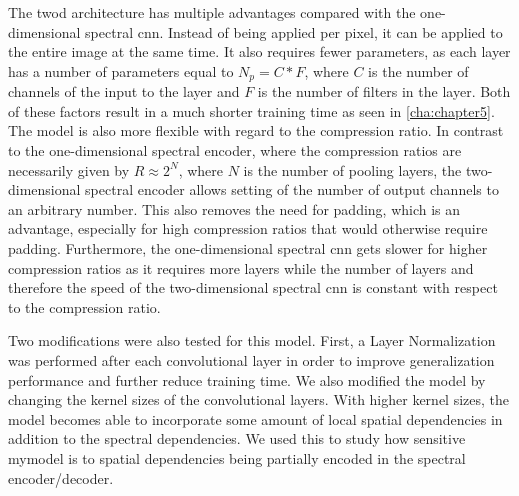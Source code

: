 The \ac{twod} architecture has multiple advantages compared with the one-dimensional spectral \ac{cnn}. Instead of being applied per pixel, it can be applied to the entire image at the same time. It also requires fewer parameters, as each layer has a number of parameters equal to $N_p = C * F$, where $C$ is the number of channels of the input to the layer and $F$ is the number of filters in the layer. Both of these factors result in a much shorter training time as seen in \autoref{cha:chapter5}. The model is also more flexible with regard to the compression ratio. In contrast to the one-dimensional spectral encoder, where the compression ratios are necessarily given by $R \approx 2^N$, where $N$ is the number of pooling layers, the two-dimensional spectral encoder allows setting of the number of output channels to an arbitrary number. This also removes the need for padding, which is an advantage, especially for high compression ratios that would otherwise require padding. Furthermore, the one-dimensional spectral \ac{cnn} gets slower for higher compression ratios as it requires more layers while the number of layers and therefore the speed of the two-dimensional spectral \ac{cnn} is constant with respect to the compression ratio.

Two modifications were also tested for this model. First, a Layer Normalization was performed after each convolutional layer in order to improve generalization performance and further reduce training time.  We also modified the model by changing the kernel sizes of the convolutional layers. With higher kernel sizes, the model becomes able to incorporate some amount of local spatial dependencies in addition to the spectral dependencies. We used this to study how sensitive \ac{mymodel} is to spatial dependencies being partially encoded in the spectral encoder/decoder.
